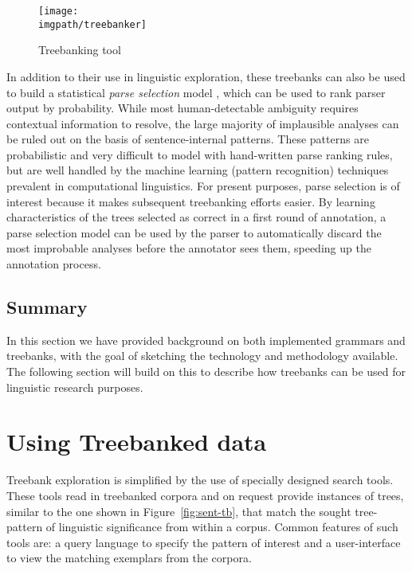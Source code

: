 \begin{figure}
\centering
\texttt{[image: \\imgpath/treebanker]}
\caption{Treebanking tool}
\label{fig:tsdb}
\end{figure}

In addition to their use in linguistic exploration, these treebanks can also be
used to build a statistical \textit{parse selection} model
\citep{Joh:Gem:Can:Chi:Rie:99,Tou:Man:Fli:Oep:2005}, which can be used to rank
parser output by probability.  While most human-detectable ambiguity requires
contextual information to resolve, the large majority of implausible analyses
can be ruled out on the basis of sentence-internal patterns.  These patterns are
probabilistic and very difficult to model with hand-written parse ranking rules,
but are well handled by the machine learning (pattern recognition) techniques
prevalent in computational linguistics.  For present purposes, parse selection
is of interest because it makes subsequent treebanking efforts easier.  By
learning characteristics of the trees selected as correct in a first round of
annotation, a parse selection model can be used by the parser to automatically
discard the most improbable analyses before the annotator sees them, speeding up
the annotation process.

\subsection{Summary}

In this section we have provided background on both implemented
grammars and treebanks, with the goal of sketching the technology
and methodology available.  The following section will build on this
to describe how treebanks can be used for linguistic research purposes.

\section{Using Treebanked data}
\label{sec:ts}

Treebank exploration is simplified by the use of specially designed
search tools.  These tools read in treebanked corpora and on request
provide instances of trees, similar to the one shown in 
Figure~\ref{fig:sent-tb}, that match the sought tree-pattern of linguistic 
significance from within a corpus.  Common features of
such tools are: a query language to specify the pattern of
interest and a user-interface to view the matching exemplars from
the corpora.


